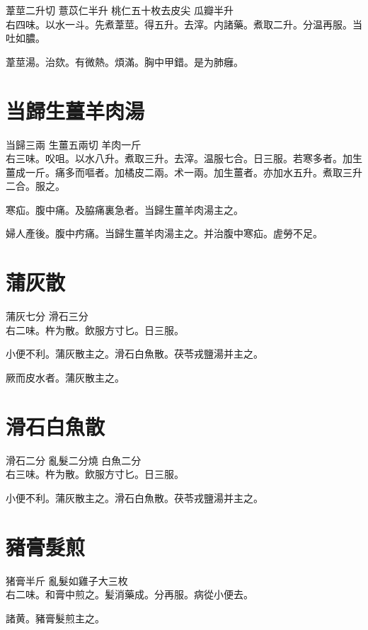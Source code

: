 葦莖{\scriptsize 二升切} 薏苡仁{\scriptsize 半升} 桃仁{\scriptsize 五十枚去皮尖} 瓜瓣{\scriptsize 半升}\\
右四味。以水一斗。先煮葦莖。得五升。去滓。内諸藥。煮取二升。分温再服。当吐如膿。

葦莖湯。治欬。有微熱。煩滿。胸中甲錯。是为肺癰。

\section{当歸生薑羊肉湯}

当歸{\scriptsize 三兩} 生薑{\scriptsize 五兩切} 羊肉{\scriptsize 一斤}\\
右三味。㕮咀。以水八升。煮取三升。去滓。温服七合。日三服。若寒多者。加生薑成一斤。痛多而嘔者。加橘皮二兩。术一兩。加生薑者。亦加水五升。煮取三升二合。服之。

寒疝。腹中痛。及脇痛裏急者。当歸生薑羊肉湯主之。

{\khaaitp 婦人}產後。腹中㽲痛。当歸生薑羊肉湯主之。并治腹中寒疝。虗勞不足。

\section{蒲灰散}

蒲灰{\scriptsize 七分} 滑石{\scriptsize 三分}\\
右二味。杵为散。飲服方寸匕。日三服。

小便不利。蒲灰散主之。滑石白魚散。茯苓戎鹽湯并主之。

厥而皮水者。蒲灰散主之。

\section{滑石白魚散}

滑石{\scriptsize 二分} 亂髮{\scriptsize 二分燒} 白魚{\scriptsize 二分}\\
右三味。杵为散。飲服方寸匕。日三服。

小便不利。蒲灰散主之。滑石白魚散。茯苓戎鹽湯并主之。

\section{豬膏髮煎}

猪膏{\scriptsize 半斤} 亂髮{\scriptsize 如雞子大三枚}\\
右二味。和膏中煎之。髪消藥成。分再服。病從小便去。

諸黄。豬膏髮煎主之。

